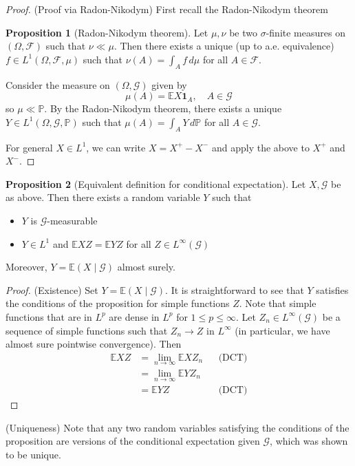 \documentclass[parskip=full]{article}
\theoremstyle{definition}
\newtheorem*{proposition}{Proposition}
\newcommand{\Pbb}{\mathbb{P}}
\newcommand{\1}{\mathbbm{1}}
\newcommand{\E}{\mathbb{E}}
\begin{document}
\begin{proof}
(Proof via Radon-Nikodym)
First recall the Radon-Nikodym theorem
\begin{proposition}[Radon-Nikodym theorem]
    Let $\mu, \nu$ be two $\sigma$-finite measures on $(\Omega, \mathcal{F})$ such that $\nu \ll \mu$. Then there exists a unique (up to a.e. equivalence) $f \in L^1(\Omega, \mathcal{F}, \mu)$ such that $\nu(A) = \int_A f \, d\mu$ for all $A \in \mathcal{F}$.
\end{proposition}
Consider the measure on $(\Omega, \mathcal{G})$ given by
\[
    \mu(A) = \E X \mathbf{1}_A, \quad A \in \mathcal{G}
\]
so $\mu \ll \Pbb$. By the Radon-Nikodym theorem, there exists a unique $Y \in L^1(\Omega, \mathcal{G}, \Pbb)$ such that $\mu(A) = \int_A Y \, d\Pbb$ for all $A \in \mathcal{G}$.

For general $X \in L^1$, we can write $X = X^+ - X^-$ and apply the above to $X^+$ and $X^-$.
\end{proof}

\begin{proposition}[Equivalent definition for conditional expectation]
Let $X, \mathcal{G}$ be as above. Then there exists a random variable $Y$ such that
\begin{itemize}
    \item $Y$ is $\mathcal{G}$-measurable
    \item $Y \in L^1$ and $\E X Z = \E Y Z$ for all $Z \in L^\infty(\mathcal{G})$ 
\end{itemize}

Moreover, $Y = \E(X \mid \mathcal{G})$ almost surely.
\end{proposition}

\begin{proof}
(Existence)
Set $Y = \E(X \mid \mathcal{G})$. It is straightforward to see that $Y$ satisfies the conditions of the proposition for simple functions $Z$. Note that simple functions that are in $L^p$ are dense in $L^p$ for $1 \leq p \leq \infty$. Let $Z_n \in L^\infty(\mathcal{G})$ be a sequence of simple functions such that $Z_n \to Z$ in $L^\infty$ (in particular, we have almost sure pointwise convergence). Then
\begin{align*}
    \E X Z &= \lim_{n \to \infty} \E X Z_n &&\text{(DCT)}\\
    &= \lim_{n \to \infty} \E Y Z_n\\
    &= \E Y Z &&\text{(DCT)}
\end{align*}
\end{proof}

(Uniqueness) Note that any two random variables satisfying the conditions of the proposition are versions of the conditional expectation given $\mathcal{G}$, which was shown to be unique.
\end{document}
